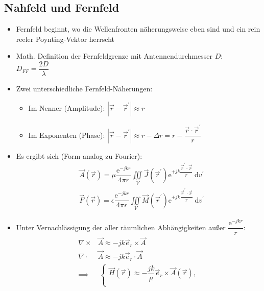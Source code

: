 {\subsection{Nahfeld und Fernfeld}
\begin{itemize}
    \itemsep0pt
    \item Fernfeld beginnt, wo die Wellenfronten näherungsweise eben sind und ein rein reeler Poynting-Vektor herrscht
    \item Math. Definition der Fernfeldgrenze mit Antennendurchmesser $D$:\\
        \(D_{FF} = \dfrac{2D}{\lambda}\)
    \item Zwei unterschiedliche Fernfeld-Näherungen:\\
        \begin{itemize}
        \itemsep0pt
        \item Im Nenner (Amplitude): \(|\vec{r} - \vec{r}^\prime| \approx r\)
        \item Im Exponenten (Phase): \(|\vec{r} - \vec{r}^\prime| \approx r - \Delta r = r - \dfrac{\vec{r} \cdot \vec{r}^\prime}{r}\)
        \end{itemize}
    \item Es ergibt sich (Form analog zu Fourier):\\
            \begin{align*}
                &\vec{A}(\vec{r}) = \mu\dfrac{\mathrm{e}^{-jkr}}{4\pi r} \iiint\limits_V \vec{J}(\vec{r}^\prime) \mathrm{e}^{+jk\dfrac{\vec{r}^\prime \cdot \vec{r}}{r}} \:\mathrm{d}v^\prime\\
                &\vec{F}(\vec{r}) = \epsilon\dfrac{\mathrm{e}^{-jkr}}{4\pi r} \iiint\limits_V \vec{M}(\vec{r}^\prime) \mathrm{e}^{+jk\dfrac{\vec{r}^\prime \cdot \vec{r}}{r}} \:\mathrm{d}v^\prime
            \end{align*}
        \item Unter Vernachlässigung der aller räumlichen Abhängigkeiten außer $\dfrac{\mathrm{e}^{-jkr}}{r}$:\\
            \begin{align*}
                \nabla\times&\vec{A} \approx -jk\vec{e}_r\times\vec{A}\\
                \nabla\cdot&\vec{A} \approx -jk\vec{e}_r\cdot\vec{A}\\
                \implies&\
                \begin{cases}%
                    \vec{H}(\vec{r}) \approx -\dfrac{jk}{\mu}\vec{e}_r\times\vec{A}(\vec{r}),\\

\end{cases}
\end{align*}
\end{itemize}}
